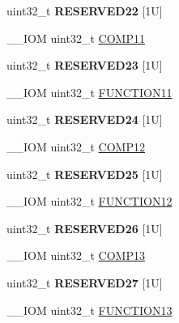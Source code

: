 \begin{DoxyCompactItemize}
\item 
\mbox{\label{struct_d_w_t___type_ab4eff17a1119c7ee5cab7e0326fd4339}} 
uint32\+\_\+t {\bfseries R\+E\+S\+E\+R\+V\+E\+D22} \mbox{[}1\+U\mbox{]}
\item 
\+\_\+\+\_\+\+I\+OM uint32\+\_\+t \mbox{\hyperlink{struct_d_w_t___type_aa199b91c854edd21ded38b8922d1e2a7}{C\+O\+M\+P11}}
\item 
\mbox{\label{struct_d_w_t___type_ab3261dfc078ae8aaac1b096bda2cc15a}} 
uint32\+\_\+t {\bfseries R\+E\+S\+E\+R\+V\+E\+D23} \mbox{[}1\+U\mbox{]}
\item 
\+\_\+\+\_\+\+I\+OM uint32\+\_\+t \mbox{\hyperlink{struct_d_w_t___type_a214f7478184150e43175c05aecad6c96}{F\+U\+N\+C\+T\+I\+O\+N11}}
\item 
\mbox{\label{struct_d_w_t___type_a2cc26bd6d706077ca9cd56cc20ff2b9d}} 
uint32\+\_\+t {\bfseries R\+E\+S\+E\+R\+V\+E\+D24} \mbox{[}1\+U\mbox{]}
\item 
\+\_\+\+\_\+\+I\+OM uint32\+\_\+t \mbox{\hyperlink{struct_d_w_t___type_a9115fd187d8cbcb9d6ec5eba938b81ea}{C\+O\+M\+P12}}
\item 
\mbox{\label{struct_d_w_t___type_a1ff4d863ad093166492d59615592f0e1}} 
uint32\+\_\+t {\bfseries R\+E\+S\+E\+R\+V\+E\+D25} \mbox{[}1\+U\mbox{]}
\item 
\+\_\+\+\_\+\+I\+OM uint32\+\_\+t \mbox{\hyperlink{struct_d_w_t___type_a521771b3dfe2ea48463e1e91d01448b6}{F\+U\+N\+C\+T\+I\+O\+N12}}
\item 
\mbox{\label{struct_d_w_t___type_a985a01a8b63bcf2f338b3391055f6163}} 
uint32\+\_\+t {\bfseries R\+E\+S\+E\+R\+V\+E\+D26} \mbox{[}1\+U\mbox{]}
\item 
\+\_\+\+\_\+\+I\+OM uint32\+\_\+t \mbox{\hyperlink{struct_d_w_t___type_abc29ac14df61ec3f8f3d28ca92892d8a}{C\+O\+M\+P13}}
\item 
\mbox{\label{struct_d_w_t___type_a0bb401cc8542799048ba8eecc41d5d97}} 
uint32\+\_\+t {\bfseries R\+E\+S\+E\+R\+V\+E\+D27} \mbox{[}1\+U\mbox{]}
\item 
\+\_\+\+\_\+\+I\+OM uint32\+\_\+t \mbox{\hyperlink{struct_d_w_t___type_af9ea0b56769614c5c5699003b3df39f0}{F\+U\+N\+C\+T\+I\+O\+N13}}
\item 

\end{DoxyCompactItemize}

